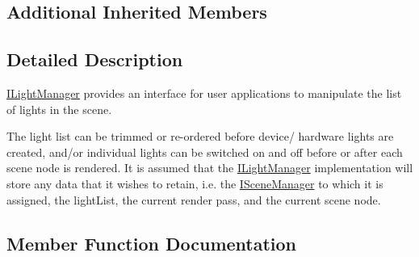 \subsection*{Additional Inherited Members}


\subsection{Detailed Description}
\hyperlink{classirr_1_1scene_1_1ILightManager}{I\+Light\+Manager} provides an interface for user applications to manipulate the list of lights in the scene. 

The light list can be trimmed or re-\/ordered before device/ hardware lights are created, and/or individual lights can be switched on and off before or after each scene node is rendered. It is assumed that the \hyperlink{classirr_1_1scene_1_1ILightManager}{I\+Light\+Manager} implementation will store any data that it wishes to retain, i.\+e. the \hyperlink{classirr_1_1scene_1_1ISceneManager}{I\+Scene\+Manager} to which it is assigned, the light\+List, the current render pass, and the current scene node. 

\subsection{Member Function Documentation}
\mbox{\label{classirr_1_1scene_1_1ILightManager_aa9e6195a3a783a97f440a4b947090ab0}} 
